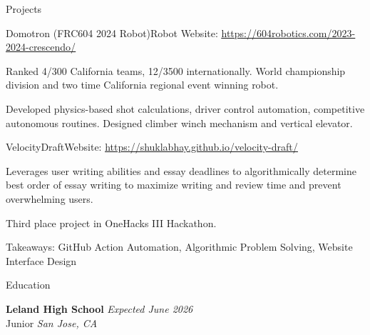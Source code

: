 \documentclass[
  11pt, %
]{public/resume/resume} %
\begin{document}
\begin{rSection}{Projects}
\begin{rSubsection}{Domotron (FRC604 2024 Robot)}{}{Robot Website: \underline{\href{https://604robotics.com/2023-2024-crescendo/}{https://604robotics.com/2023-2024-crescendo/}}}{}
    \item Ranked 4/300 California teams, 12/3500 internationally. World championship division and two time California regional event winning robot.
        
    \item Developed physics-based shot calculations, driver control automation, competitive autonomous routines. Designed climber winch mechanism and vertical elevator.
        
  \end{rSubsection}
      
  \begin{rSubsection}{VelocityDraft}{}{Website: \underline{\href{https://shuklabhay.github.io/velocity-draft/}{https://shuklabhay.github.io/velocity-draft/}}}{}
       
    \item Leverages user writing abilities and essay deadlines to algorithmically determine best order of essay writing to maximize writing and review time and prevent overwhelming users.
        
    \item Third place project in OneHacks III Hackathon.
        
    \item Takeaways: GitHub Action Automation, Algorithmic Problem Solving, Website Interface Design
        
  \end{rSubsection}
      
	
\end{rSection}
    

\begin{rSection}{Education}
	
	\textbf{Leland High School} \hfill \textit{Expected June 2026} \\
	Junior \hfill \textit{San Jose, CA}
	
\end{rSection}

\end{document}
